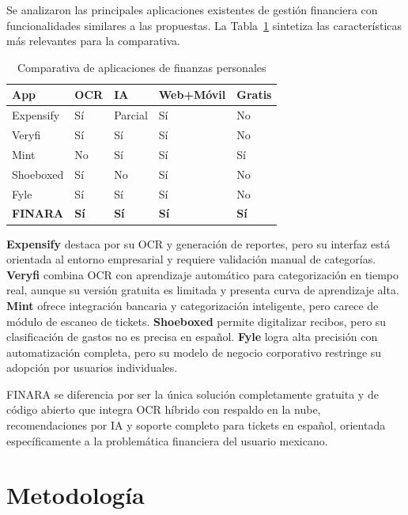 \documentclass[10pt,twocolumn,letterpaper]{article}
\begin{document}
Se analizaron las principales aplicaciones existentes de gestión financiera con funcionalidades
similares a las propuestas. La Tabla~\ref{tab:estadoarte} sintetiza las características más
relevantes para la comparativa.

\begin{table}[H]
  \centering
  \small
  \caption{Comparativa de aplicaciones de finanzas personales}
  \label{tab:estadoarte}
  \renewcommand{\arraystretch}{1.1}
  \begin{tabular}{p{1.5cm}p{1.4cm}p{1.1cm}p{1.2cm}p{1.2cm}}
    \toprule
    \textbf{App} & \textbf{OCR} & \textbf{IA} & \textbf{Web+Móvil} & \textbf{Gratis} \\
    \midrule
    Expensify & Sí & Parcial & Sí & No \\
    Veryfi    & Sí & Sí      & Sí & No \\
    Mint      & No & Sí      & Sí & Sí \\
    Shoeboxed & Sí & No      & Sí & No \\
    Fyle      & Sí & Sí      & Sí & No \\
    \textbf{FINARA} & \textbf{Sí} & \textbf{Sí} & \textbf{Sí} & \textbf{Sí} \\
    \bottomrule
  \end{tabular}
\end{table}

\textbf{Expensify} destaca por su OCR y generación de reportes, pero su interfaz está orientada al
entorno empresarial y requiere validación manual de categorías. \textbf{Veryfi} combina OCR con
aprendizaje automático para categorización en tiempo real, aunque su versión gratuita es limitada
y presenta curva de aprendizaje alta. \textbf{Mint} ofrece integración bancaria y categorización
inteligente, pero carece de módulo de escaneo de tickets. \textbf{Shoeboxed} permite digitalizar
recibos, pero su clasificación de gastos no es precisa en español. \textbf{Fyle} logra alta
precisión con automatización completa, pero su modelo de negocio corporativo restringe su adopción
por usuarios individuales.

FINARA se diferencia por ser la única solución completamente gratuita y de código abierto que
integra OCR híbrido con respaldo en la nube, recomendaciones por IA y soporte completo para
tickets en español, orientada específicamente a la problemática financiera del usuario mexicano.


\section{Metodología}
\end{document}
